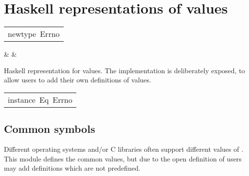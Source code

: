 \section{Haskell representations of  values
}
\begin{haddockdesc}
\item[\begin{tabular}{@{}l}
newtype\ Errno
\end{tabular}]\haddockbegindoc
\haddockbeginconstrs
\haddockdecltt{=} &  & \\
\haddockendconstrs\par
Haskell representation for  values.
 The implementation is deliberately exposed, to allow users to add
 their own definitions of  values.
\par

\end{haddockdesc}
\begin{haddockdesc}
\item[\begin{tabular}{@{}l}
instance\ Eq\ Errno
\end{tabular}]
\end{haddockdesc}
\subsection{Common  symbols
}
Different operating systems and/or C libraries often support
 different values of .  This module defines the common values,
 but due to the open definition of  users may add definitions
 which are not predefined.
\par

